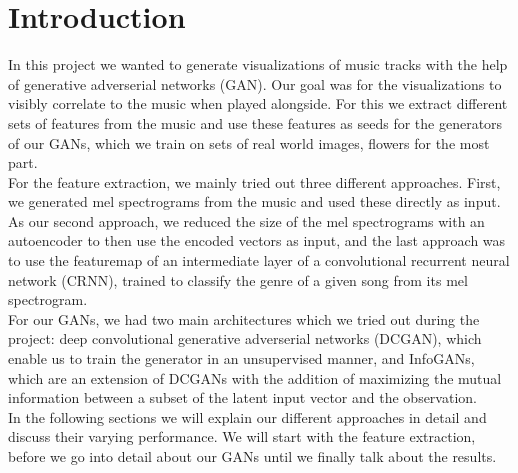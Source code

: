\chapter{Introduction}
  In this project we wanted to generate visualizations of music tracks with the help of generative adverserial networks (GAN). 
  Our goal was for the visualizations to visibly correlate to the music when played alongside.
  For this we extract different sets of features from the music and use these features as seeds for the generators of our GANs, which we train on sets of real world images, flowers for the most part.\\
  For the feature extraction, we mainly tried out three different approaches. First, we generated mel spectrograms from the music and used these directly as input. 
  As our second approach, we reduced the size of the mel spectrograms with an autoencoder to then use the encoded vectors as input, and the last approach was to use the featuremap of an intermediate layer of a convolutional recurrent neural network (CRNN), trained to classify the genre of a given song from its mel spectrogram.\\
  For our GANs, we had two main architectures which we tried out during the project: deep convolutional generative adverserial networks (DCGAN), which enable us to train the generator in an unsupervised manner, and InfoGANs, which are an extension of DCGANs with the addition of maximizing
  the mutual information between a subset of the latent input vector and the observation.\\
  In the following sections we will explain our different approaches in detail and discuss their varying performance. We will start with the feature extraction, before we go into detail about our GANs until we finally talk about the results.